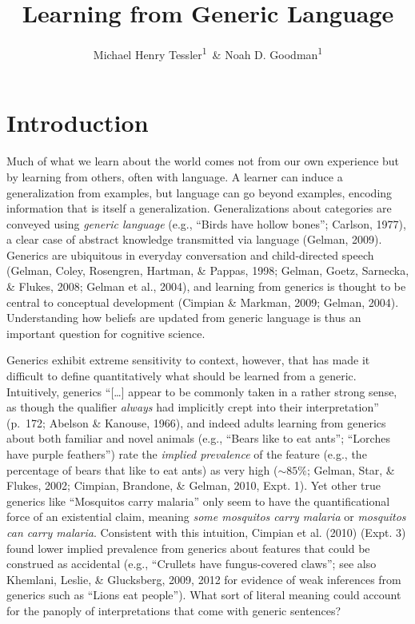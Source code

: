 \documentclass[floatsintext,doc]{apa6}
\title{Learning from Generic Language}
\author{Michael Henry Tessler\textsuperscript{1}~\& Noah D. Goodman\textsuperscript{1}}
\date{}
\affiliation{
\vspace{0.5cm}
\textsuperscript{1} Department of Psychology, Stanford University}
\begin{document}
\maketitle



\hypertarget{introduction}{%
\section{Introduction}\label{introduction}}

Much of what we learn about the world comes not from our own experience but by learning from others, often with language.
A learner can induce a generalization from examples, but language can go beyond examples, encoding information that is itself a generalization.
Generalizations about categories are conveyed using \emph{generic language} (e.g., ``Birds have hollow bones''; Carlson, 1977), a clear case of abstract knowledge transmitted via language (Gelman, 2009).
Generics are ubiquitous in everyday conversation and child-directed speech (Gelman, Coley, Rosengren, Hartman, \& Pappas, 1998; Gelman, Goetz, Sarnecka, \& Flukes, 2008; Gelman et al., 2004), and learning from generics is thought to be central to conceptual development (Cimpian \& Markman, 2009; Gelman, 2004).
Understanding how beliefs are updated from generic language is thus an important question for cognitive science.

Generics exhibit extreme sensitivity to context, however, that has made it difficult to define quantitatively what should be learned from a generic.
Intuitively, generics \enquote{{[}\ldots{}{]} appear to be commonly taken in a rather strong sense, as though the qualifier \emph{always} had implicitly crept into their interpretation} (p.~172; Abelson \& Kanouse, 1966), and indeed adults learning from generics about both familiar and novel animals (e.g., \enquote{Bears like to eat ants}; \enquote{Lorches have purple feathers}) rate the \emph{implied prevalence} of the feature (e.g., the percentage of bears that like to eat ants) as very high (\(\sim 85\%\); Gelman, Star, \& Flukes, 2002; Cimpian, Brandone, \& Gelman, 2010, Expt. 1).
Yet other true generics like \enquote{Mosquitos carry malaria} only seem to have the quantificational force of an existential claim, meaning \emph{some mosquitos carry malaria} or \emph{mosquitos can carry malaria}.
Consistent with this intuition, Cimpian et al. (2010) (Expt. 3) found lower implied prevalence from generics about features that could be construed as accidental (e.g., ``Crullets have fungus-covered claws''; see also Khemlani, Leslie, \& Glucksberg, 2009, 2012 for evidence of weak inferences from generics such as ``Lions eat people'').
What sort of literal meaning could account for the panoply of interpretations that come with generic sentences?
\end{document}
